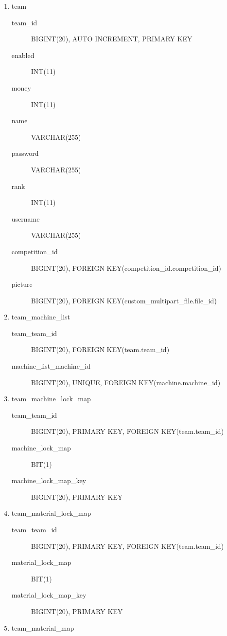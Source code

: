 \documentclass{article}
\begin{document}
{\begin{enumerate}
\begin{description}
      \item[trade\_list\_trade\_id] BIGINT(20), UNIQUE, FOREIGN KEY(trade.trade\_id)
    \end{description}
  \item team
    \begin{description}
      \item[team\_id] BIGINT(20), AUTO INCREMENT, PRIMARY KEY
      \item[enabled] INT(11)
      \item[money] INT(11)
      \item[name] VARCHAR(255)
      \item[password] VARCHAR(255)
      \item[rank] INT(11)
      \item[username] VARCHAR(255)
      \item[competition\_id] BIGINT(20), FOREIGN KEY(competition\_id.competition\_id)
      \item[picture] BIGINT(20), FOREIGN KEY(custom\_multipart\_file.file\_id)
    \end{description}
  \item team\_machine\_list
    \begin{description}
      \item[team\_team\_id] BIGINT(20), FOREIGN KEY(team.team\_id)
      \item[machine\_list\_machine\_id] BIGINT(20), UNIQUE, FOREIGN KEY(machine.machine\_id)
    \end{description}
  \item team\_machine\_lock\_map
    \begin{description}
      \item[team\_team\_id] BIGINT(20), PRIMARY KEY, FOREIGN KEY(team.team\_id)
      \item[machine\_lock\_map] BIT(1)
      \item[machine\_lock\_map\_key] BIGINT(20), PRIMARY KEY
    \end{description}
  \item team\_material\_lock\_map
    \begin{description}
      \item[team\_team\_id] BIGINT(20), PRIMARY KEY, FOREIGN KEY(team.team\_id)
      \item[material\_lock\_map] BIT(1)
      \item[material\_lock\_map\_key] BIGINT(20), PRIMARY KEY
    \end{description}
  \item team\_material\_map

\end{enumerate}}
\end{document}
